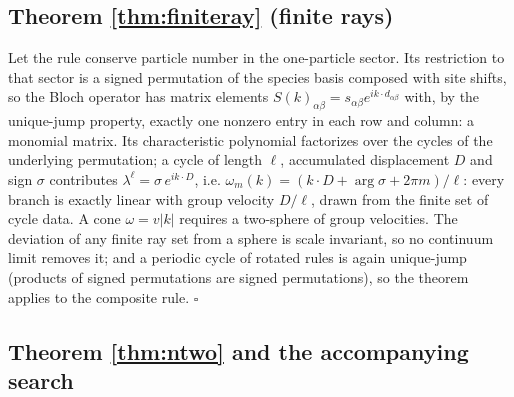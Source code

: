 \documentclass[aps,prd,twocolumn,superscriptaddress,nofootinbib,floatfix]{revtex4-2}
\begin{document}
\subsection{Theorem \ref{thm:finiteray} (finite rays)}

Let the rule conserve particle number in the one-particle sector. Its
restriction to that sector is a signed permutation of the species basis
composed with site shifts, so the Bloch operator has matrix elements
$S(k)_{\alpha\beta}=s_{\alpha\beta}e^{ik\cdot d_{\alpha\beta}}$ with, by
the unique-jump property, exactly one nonzero entry in each row and column:
a monomial matrix. Its characteristic polynomial factorizes over the cycles
of the underlying permutation; a cycle of length $\ell$, accumulated
displacement $D$ and sign $\sigma$ contributes
$\lambda^\ell=\sigma\,e^{ik\cdot D}$, i.e.
$\omega_m(k)=(k\cdot D+\arg\sigma+2\pi m)/\ell$: every branch is exactly
linear with group velocity $D/\ell$, drawn from the finite set of cycle
data. A cone $\omega=v|k|$ requires a two-sphere of group velocities. The
deviation of any finite ray set from a sphere is scale invariant, so no
continuum limit removes it; and a periodic cycle of rotated rules is again
unique-jump (products of signed permutations are signed permutations), so
the theorem applies to the composite rule. \hfill$\square$

\subsection{Theorem \ref{thm:ntwo} and the accompanying search}
\end{document}

